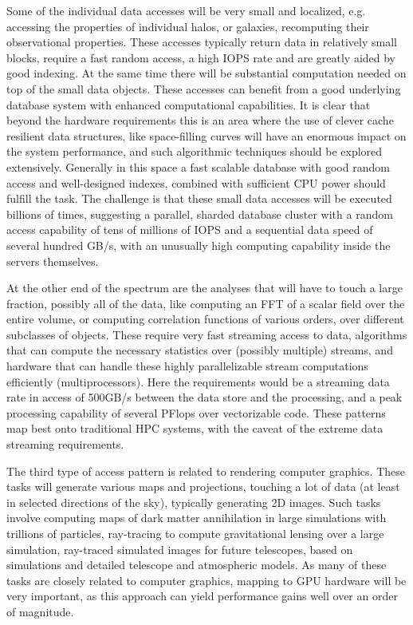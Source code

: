 Some of the individual data accesses will be very small and localized,
e.g. accessing the properties of individual halos, or galaxies,
recomputing their observational properties. These accesses typically
return data in relatively small blocks, require a fast random access,
a high IOPS rate and are greatly aided by good indexing. At the same
time there will be substantial computation needed on top of the small
data objects. These accesses can benefit from a good underlying
database system with enhanced computational capabilities. It is clear
that beyond the hardware requirements this is an area where the use of
clever cache resilient data structures, like space-filling curves will
have an enormous impact on the system performance, and such
algorithmic techniques should be explored extensively. Generally in
this space a fast scalable database with good random access and
well-designed indexes, combined with sufficient CPU power should
fulfill the task. The challenge is that these small data accesses will
be executed billions of times, suggesting a parallel, sharded database
cluster with a random access capability of tens of millions of IOPS
and a sequential data speed of several hundred GB/s, with an unusually
high computing capability inside the servers themselves.

At the other end of the spectrum are the analyses that will have to
touch a large fraction, possibly all of the data, like computing an
FFT of a scalar field over the entire volume, or computing correlation
functions of various orders, over different subclasses of
objects. These require very fast streaming access to data, algorithms
that can compute the necessary statistics over (possibly multiple)
streams, and hardware that can handle these highly parallelizable
stream computations efficiently (multiprocessors). Here the
requirements would be a streaming data rate in access of 500GB/s
between the data store and the processing, and a peak processing
capability of several PFlops over vectorizable code. These patterns
map best onto traditional HPC systems, with the caveat of the extreme
data streaming requirements.

The third type of access pattern is related to rendering computer
graphics. These tasks will generate various maps and projections,
touching a lot of data (at least in selected directions of the sky),
typically generating 2D images. Such tasks involve computing maps of
dark matter annihilation in large simulations with trillions of
particles, ray-tracing to compute gravitational lensing over a large
simulation, ray-traced simulated images for future telescopes, based
on simulations and detailed telescope and atmospheric models. As many
of these tasks are closely related to computer graphics, mapping to
GPU hardware will be very important, as this approach can yield
performance gains well over an order of magnitude.

